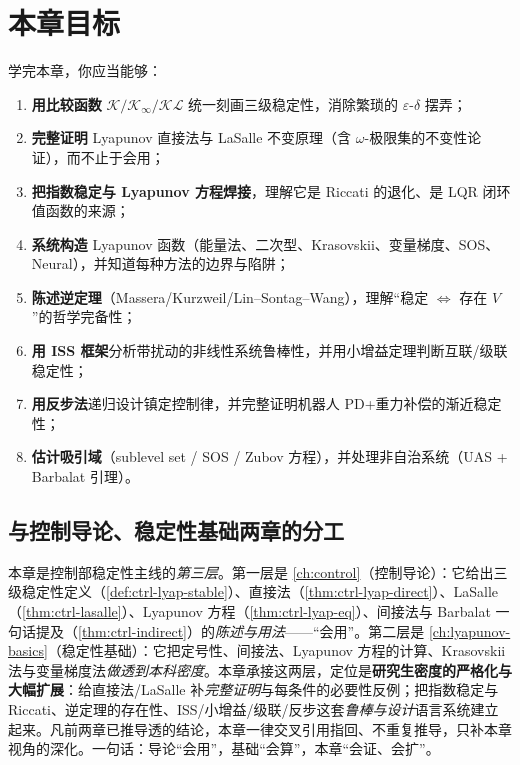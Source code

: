 \section*{本章目标}
学完本章，你应当能够：
\begin{enumerate}
  \item \textbf{用比较函数} $\mathcal{K}/\mathcal{K}_\infty/\mathcal{KL}$ 统一刻画三级稳定性，消除繁琐的 $\varepsilon$-$\delta$ 摆弄；
  \item \textbf{完整证明} Lyapunov 直接法与 LaSalle 不变原理（含 $\omega$-极限集的不变性论证），而不止于会用；
  \item \textbf{把指数稳定与 Lyapunov 方程焊接}，理解它是 Riccati 的退化、是 LQR 闭环值函数的来源；
  \item \textbf{系统构造} Lyapunov 函数（能量法、二次型、Krasovskii、变量梯度、SOS、Neural），并知道每种方法的边界与陷阱；
  \item \textbf{陈述逆定理}（Massera/Kurzweil/Lin–Sontag–Wang），理解“稳定 $\Leftrightarrow$ 存在 $V$”的哲学完备性；
  \item \textbf{用 ISS 框架}分析带扰动的非线性系统鲁棒性，并用小增益定理判断互联/级联稳定性；
  \item \textbf{用反步法}递归设计镇定控制律，并完整证明机器人 PD+重力补偿的渐近稳定性；
  \item \textbf{估计吸引域}（sublevel set / SOS / Zubov 方程），并处理非自治系统（UAS + Barbalat 引理）。
\end{enumerate}

\subsection*{与控制导论、稳定性基础两章的分工}
本章是控制部稳定性主线的\emph{第三层}。第一层是 \cref{ch:control}（控制导论）：它给出三级稳定性定义（\cref{def:ctrl-lyap-stable}）、直接法（\cref{thm:ctrl-lyap-direct}）、LaSalle（\cref{thm:ctrl-lasalle}）、Lyapunov 方程（\cref{thm:ctrl-lyap-eq}）、间接法与 Barbalat 一句话提及（\cref{thm:ctrl-indirect}）的\emph{陈述与用法}——“会用”。第二层是 \cref{ch:lyapunov-basics}（稳定性基础）：它把定号性、间接法、Lyapunov 方程的计算、Krasovskii 法与变量梯度法\emph{做透到本科密度}。本章承接这两层，定位是\textbf{研究生密度的严格化与大幅扩展}：给直接法/LaSalle 补\emph{完整证明}与每条件的必要性反例；把指数稳定与 Riccati、逆定理的存在性、ISS/小增益/级联/反步这套\emph{鲁棒与设计}语言系统建立起来。凡前两章已推导透的结论，本章一律交叉引用指回、不重复推导，只补本章视角的深化。一句话：导论“会用”，基础“会算”，本章“会证、会扩”。

